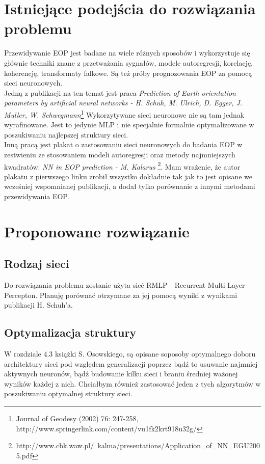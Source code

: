 \documentclass[12pt,a4]{article}
\begin{document}
\section{Istniejące podejścia do rozwiązania problemu}

\indent Przewidywanie EOP jest badane na wiele różnych sposobów i
wykorzystuje się głównie techniki znane z przetważania sygnałów,
modele autoregresji, korelację, koherencję, transformaty falkowe. Są
też próby prognozowania EOP za pomocą sieci neuronowych.\\
\indent Jedną z publikacji na ten temat jest praca \emph{Prediction of Earth
orientation parameters by artificial neural networks - H. Schuh, M.
Ulrich, D. Egger, J. Muller, W. Schwegmann}\footnote{Journal of Geodesy
(2002) 76: 247-258,\\http://www.springerlink.com/content/vu1fk2krt918u32g/}
Wykorzytywane sieci neuronowe nie są tam jednak wyrafinowane. Jest to
jedynie MLP i nie specjalnie formalnie optymalizowane w poszukiwaniu
najlepszej struktury sieci.\\
\indent Inną pracą jest plakat o zastosowaniu sieci neuronowych do
badania EOP w zestwieniu ze stosowaniem modeli autoregresji oraz
metody najmniejszych kwadratów: \emph{NN in EOP prediction - M. Kalarus}
\footnote{http://www.cbk.waw.pl/~kalma/presentations/Application\_of\_NN\_EGU2005.pdf}.
Mam wrażenie, że autor plakatu z pierwszego linku zrobił wszystko dokładnie tak jak to jest
opisane we wcześniej wspomnianej publikacji, a dodał tylko porównanie
z innymi metodami przewidywania EOP.

\section{Proponowane rozwiązanie}

\subsection{Rodzaj sieci}
Do rozwiązania problemu zostanie użyta sieć RMLP - Recurrent Multi
Layer Percepton. Planuję porównać otrzymane za jej pomocą wyniki z
wynikami publikacji H. Schuh'a.

\subsection{Optymalizacja struktury}
W rozdziale 4.3 książki S. Osowskiego, są opisane soposoby optymalnego
doboru architektury sieci pod względem generalizacji poprzez bądź to
usuwanie najmniej aktywnych neuronów, bądź
budowanie kilku sieci i braniu średniej ważonej wyników każdej z nich.
Chciałbym również zastosować jeden z tych algorytmów w poszukiwaniu
optymalnej struktury sieci.
\end{document}
